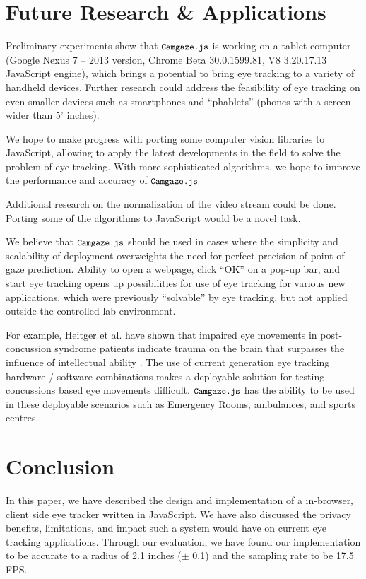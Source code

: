 \documentclass[annual]{acmsiggraph}
\newcommand{\Acronym}[1]{\ensuremath{{\small{\texttt{#1}}}}}
\newcommand{\Name}{\Acronym{Camgaze.js}} \newcommand{\False}{\Constant{false}}
\newcommand{\Constant}[1]{\ensuremath{\small{\texttt{#1}}}}
\begin{document}
\section{Future Research \& Applications}

Preliminary experiments show that $\Name$ is working on a tablet computer
(Google Nexus 7 -- 2013 version, Chrome Beta 30.0.1599.81, V8 3.20.17.13
JavaScript engine), which brings a potential to bring eye tracking to a
variety of handheld devices. Further research could address the feasibility of
eye tracking on even smaller devices such as smartphones and “phablets” (phones
with a screen wider than 5’ inches).

We hope to make progress with porting some computer vision libraries to
JavaScript, allowing to apply the latest developments in the field to solve the
problem of eye tracking. With more sophisticated algorithms, we hope to improve
the performance and accuracy of $\Name$

Additional research on the normalization of the video stream could be done.
Porting some of the algorithms to JavaScript would be a novel task.

We believe that $\Name$ should be used in cases where the simplicity and
scalability of deployment overweights the need for perfect precision of point
of gaze prediction. Ability to open a webpage, click “OK” on a pop-up bar, and
start eye tracking opens up possibilities for use of eye tracking for various
new applications, which were previously “solvable” by eye tracking, but not
applied outside the controlled lab environment.

For example, Heitger et al. have shown that impaired eye movements in
post-concussion syndrome patients indicate trauma on the brain that surpasses
the influence of intellectual ability \cite{Heitger2009}. The use of current
generation eye tracking hardware / software combinations makes a deployable
solution for testing concussions based eye movements difficult. $\Name$ has the
ability to be used in these deployable scenarios such as Emergency Rooms,
ambulances, and sports centres.

\section{Conclusion}

In this paper, we have described the design and implementation of a in-browser,
client side eye tracker written in JavaScript. We have also discussed the
privacy benefits, limitations, and impact such a system would have on current
eye tracking applications. Through our evaluation, we have found our
implementation to be accurate to a radius of 2.1 inches ($\pm$ 0.1) and the
sampling rate to be 17.5 FPS.
\end{document}
